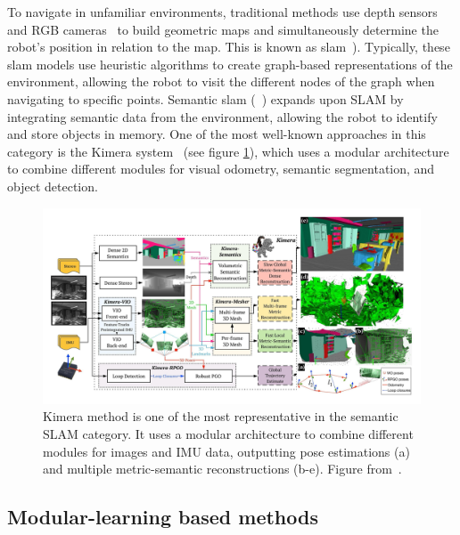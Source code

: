 To navigate in unfamiliar environments, traditional methods use depth sensors~\cite{newcombe2011, thrun2001} and RGB cameras~\cite{jones2011, sattler2018} to build geometric maps and simultaneously determine the robot's position in relation to the map.
This is known as \acrfull{slam}~\cite{Kazerouni2022, campos2021, labbe2022}).
Typically, these \acrshort{slam} models use heuristic algorithms to create graph-based representations of the environment, allowing the robot to visit the different nodes of the graph when navigating to specific points.
Semantic \acrshort{slam} (\eg~\cite{zhang2018, jin2023}) expands upon SLAM by integrating semantic data from the environment, allowing the robot to identify and store objects in memory.
One of the most well-known approaches in this category is the Kimera system~\cite{rosinol2020} (see figure \ref{fig:kimera-chart}), which uses a modular architecture to combine different modules for visual odometry, semantic segmentation, and object detection.

\begin{figure}
    \centering
    \includegraphics[width=\textwidth]{figures/related_work/kimera_chart_25 Large}
    \caption{Kimera method is one of the most representative in the semantic SLAM category.
    It uses a modular architecture to combine different modules for images and IMU data, outputting pose estimations (a) and multiple metric-semantic reconstructions (b-e).
    Figure from~\cite{rosinol2020}.}
    \label{fig:kimera-chart}
\end{figure}

\subsection{Modular-learning based methods}\label{subsec:modular-learning-based-methods}

